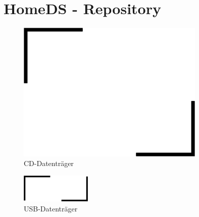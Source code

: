 \documentclass[12pt]{report}
\begin{document}



\tableofcontents










\listoffigures
{}

\lstlistoflistings {}
\newpage


\chapter*{\centering HomeDS - Repository\hline}
\centering
\large{\textbf{}}

\newline
\newline
\newline

\begin{figure}[H]
\centering
\includegraphics[width=0.8\textwidth]{images/cdBackground.png}
\caption*{CD-Datenträger}
\end{figure}

\newline
\newline
\newline

\begin{figure}[H]
\centering
\includegraphics[width=0.3\textwidth]{images/usb.png}
\caption*{USB-Datenträger}
\end{figure}

\appendix
\end{document}
